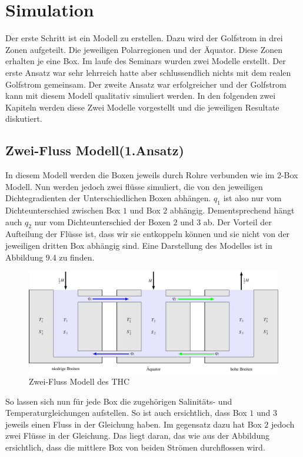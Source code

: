 \section{Simulation}

Der erste Schritt ist ein Modell zu erstellen.
Dazu wird der Golfstrom in drei Zonen aufgeteilt. Die jeweiligen Polarregionen und der Äquator. Diese Zonen erhalten je eine Box.
Im laufe des Seminars wurden zwei Modelle erstellt. Der erste Ansatz war sehr lehrreich hatte aber  schlussendlich nichts mit dem realen Golfstrom gemeinsam. Der zweite Ansatz war erfolgreicher und der Golfstrom kann mit diesem Modell qualitativ simuliert werden.
In den folgenden zwei Kapiteln werden diese Zwei Modelle vorgestellt und die jeweiligen Resultate diskutiert.

\subsection{Zwei-Fluss Modell(1.Ansatz)}

In diesem Modell werden die Boxen jeweils durch Rohre verbunden wie im 2-Box Modell. Nun werden jedoch zwei flüsse simuliert, die von den jeweiligen Dichtegradienten der Unterschiedlichen Boxen abhängen. $q_1$ ist also nur vom Dichteunterschied zwischen Box $1$ und Box $2$ abhängig. Dementsprechend hängt auch $q_2$ nur vom Dichteunterschied der  Boxen $2$ und $3$ ab.
Der Vorteil der Aufteilung der Flüsse ist, dass wir sie entkoppeln können und sie nicht von der jeweiligen dritten Box abhängig sind.
Eine Darstellung des Modelles ist in Abbildung 9.4 zu finden.

\begin{figure}
	\centering
	\includegraphics[width=14cm]{thermohalin/tikz/3b2f.pdf}
	\caption{Zwei-Fluss Modell des THC}
		\label{thermohalin:3b2f}
\end{figure}

So lassen sich nun für jede Box die zugehörigen Salinitäts- und Temperaturgleichungen aufstellen. So ist auch ersichtlich, dass Box $1$ und $3$ jeweils einen Fluss in der Gleichung haben. Im gegensatz dazu hat Box $2$ jedoch zwei Flüsse in der Gleichung. Das liegt daran, das wie aus der Abbildung ersichtlich, dass die mittlere Box von beiden Strömen durchflossen wird.


